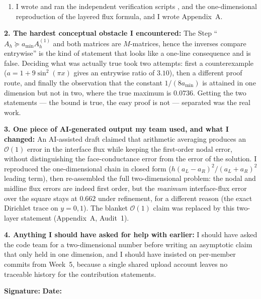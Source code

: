 \begin{formbox}
\begin{enumerate}[leftmargin=1.5em,itemsep=1pt,topsep=2pt]
    positive definite, an $M$-matrix, and satisfies a discrete maximum
    principle, and I proved the $O(h^2)$ convergence estimate. The maximum-norm
    half of that proof needed a barrier argument rather than an entrywise
    comparison of inverses: I found the counterexample that kills the naive
    argument (Appendix~A, Audit~2) and rewrote the proof with
    $\bm\varphi=\frac12x(1-x)/a_{\min}$ extended by its own boundary values.
    I also derived the spectral bound $\lambda_{\min}\ge 8a_{\min}$ and the
    matched-settings protocol used for the $\star\star$ comparison.
    \item I wrote and ran the independent verification scripts
    , 
    and the one-dimensional reproduction of the layered flux formula, and I
    wrote Appendix~A.
\end{enumerate}

\textbf{2. The hardest conceptual obstacle I encountered:}
The Step ``$A_h\succeq a_{\min}A_h^{(1)}$ and both matrices are $M$-matrices,
hence the inverses compare entrywise'' is the kind of statement that looks like
a one-line consequence and is false. Deciding what was actually true took two
attempts: first a counterexample ($a=1+9\sin^2(\pi x)$ gives an entrywise ratio
of $3.10$), then a different proof route, and finally the observation that the
constant $1/(8a_{\min})$ is attained in one dimension but not in two, where the
true maximum is $0.0736$. Getting the two statements --- the bound is true, the
easy proof is not --- separated was the real work.

\textbf{3. One piece of AI-generated output my team used, and what I changed:}
An AI-assisted draft claimed that arithmetic averaging produces an
$\mathcal{O}(1)$ error in the interface flux while keeping the first-order
nodal error, without distinguishing the face-conductance error from the error
of the solution. I reproduced the one-dimensional chain in closed form
($h(a_L-a_R)^2/(a_L+a_R)^2$ leading term), then re-assembled the full
two-dimensional problem: the nodal and midline flux errors are indeed first
order, but the \emph{maximum} interface-flux error over the square stays at
$0.662$ under refinement, for a different reason (the exact Dirichlet trace on
$y=0,1$). The blanket $\mathcal{O}(1)$ claim was replaced by this two-layer
statement (Appendix~A, Audit~1).

\textbf{4. Anything I should have asked for help with earlier:}
I should have asked the code team for a two-dimensional number before writing an
asymptotic claim that only held in one dimension, and I should have insisted on
per-member commits from Week~5, because a single shared upload account leaves
no traceable history for the contribution statements.

\textbf{Signature:} \underline{\hspace{4.2cm}} \hfill
\textbf{Date:} \underline{\hspace{2.2cm}}
\end{formbox}
